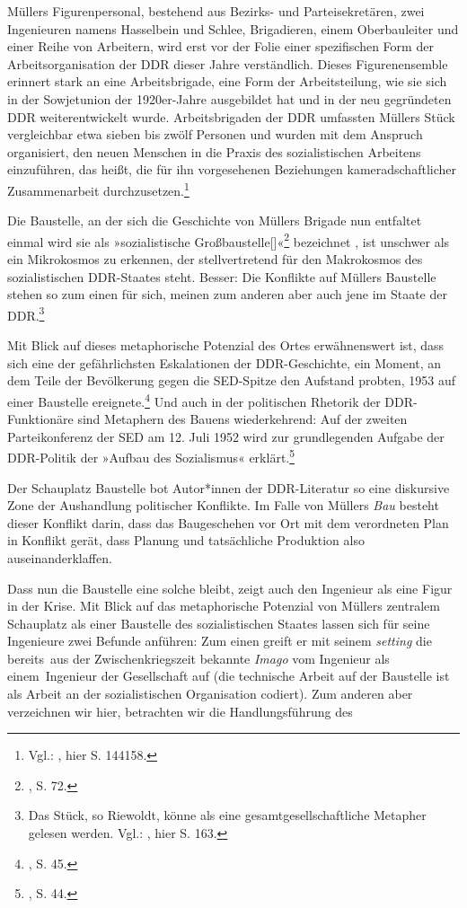 \documentclass[%
	fontsize=10pt,%
	twoside,%
	headings=optiontoheadandtoc,%
	showtrims]{scrbook}
\renewcommand{\texttt}{\nohyphens} %
\begin{document}
\par Müllers Figurenpersonal, bestehend aus Bezirks- und Parteisekretären, zwei Ingenieuren namens Hasselbein und Schlee, Brigadieren, einem Oberbauleiter und einer Reihe von Arbeitern, wird erst vor der Folie einer spezifischen Form der Arbeitsorganisation der DDR dieser Jahre verständlich. Dieses Figurenensemble erinnert stark an eine Arbeitsbrigade, eine Form der Arbeitsteilung, wie sie sich in der Sowjetunion der 1920er-Jahre ausgebildet hat und in der neu gegründeten DDR weiterentwickelt wurde. Arbeitsbrigaden der DDR umfassten \textendash{} Müllers Stück vergleichbar \textendash{} etwa sieben bis zwölf Personen und wurden mit dem Anspruch organisiert, den neuen Menschen in die Praxis des sozialistischen Arbeitens einzuführen, das heißt, die für ihn vorgesehenen Beziehungen kameradschaftlicher Zusammenarbeit durchzusetzen.\footnote{Vgl.: \cite[][]{roesler1994a}, hier S. 144\textendash{}158.} \par Die Baustelle, an der sich die Geschichte von Müllers Brigade nun entfaltet \textendash{} einmal wird sie als »sozialistische Großbaustelle{[}{]}«\footnote{\cite[][]{mueller1981a}, S. 72.}  bezeichnet \textendash{}, ist unschwer als ein Mikrokosmos zu erkennen, der stellvertretend für den Makrokosmos des sozialistischen DDR-Staates steht. Besser: Die Konflikte auf Müllers Baustelle stehen so zum einen für sich, meinen zum anderen aber auch jene im Staate der DDR.\footnote{Das Stück, so Riewoldt, könne als eine gesamtgesellschaftliche Metapher gelesen werden. Vgl.: \cite[][]{riewoldt1983a}, hier S. 163.} \par Mit Blick auf dieses metaphorische Potenzial des Ortes erwähnenswert ist, dass sich eine der gefährlichsten Eskalationen der DDR-Geschichte, ein Moment, an dem Teile der Bevölkerung gegen die SED-Spitze den Aufstand probten, 1953 auf einer Baustelle ereignete.\footnote{\cite[][]{stoever2008a}, S. 45.}  Und auch in der politischen Rhetorik der DDR-Funktionäre sind Metaphern des Bauens wiederkehrend: Auf der zweiten Parteikonferenz der SED am 12. Juli 1952 wird zur grundlegenden Aufgabe der DDR-Politik der »Aufbau des Sozialismus« erklärt.\footnote{\cite[][]{stoever2008a}, S. 44.} \par Der Schauplatz Baustelle bot Autor*innen der DDR-Literatur so eine diskursive Zone der Aushandlung politischer Konflikte. Im Falle von Müllers \emph{Bau} besteht dieser Konflikt darin, dass das Baugeschehen vor Ort mit dem verordneten Plan in Konflikt gerät, dass Planung und tatsächliche Produktion also auseinanderklaffen.\par Dass nun die Baustelle eine solche bleibt, zeigt auch den Ingenieur als eine Figur in der Krise. Mit Blick auf das metaphorische Potenzial von Müllers zentralem Schauplatz als einer Baustelle des sozialistischen Staates lassen sich für seine Ingenieure zwei Befunde anführen: Zum einen greift er mit seinem \emph{setting} die \texttt{bereits~aus} der Zwischenkriegszeit bekannte \emph{Imago} vom Ingenieur als \texttt{einem~Ingenieur} der Gesellschaft auf (die technische Arbeit auf der Baustelle ist als Arbeit an der sozialistischen Organisation codiert). Zum anderen aber verzeichnen wir hier, betrachten wir die Handlungsführung des 
\end{document}
